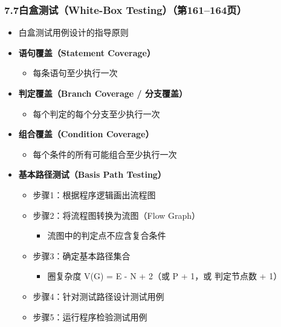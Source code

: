 \documentclass[12pt,a4paper]{ctexart}
\begin{document}
\subsubsection{7.7\quad 白盒测试（White-Box Testing）\hfill（第161--164页）}
\begin{itemize}
    \item 白盒测试用例设计的指导原则
    \item \textbf{语句覆盖（Statement Coverage）}
    \begin{itemize}
        \item 每条语句至少执行一次
    \end{itemize}
    \item \textbf{判定覆盖（Branch Coverage / 分支覆盖）}
    \begin{itemize}
        \item 每个判定的每个分支至少执行一次
    \end{itemize}
    \item \textbf{组合覆盖（Condition Coverage）}
    \begin{itemize}
        \item 每个条件的所有可能组合至少执行一次
    \end{itemize}
    \item \textbf{基本路径测试（Basis Path Testing）}
    \begin{itemize}
        \item 步骤1：根据程序逻辑画出流程图
        \item 步骤2：将流程图转换为流图（Flow Graph）
        \begin{itemize}
            \item 流图中的判定点不应含复合条件
        \end{itemize}
        \item 步骤3：确定基本路径集合
        \begin{itemize}
            \item 圈复杂度 V(G) = E - N + 2（或 P + 1，或 判定节点数 + 1）
        \end{itemize}
        \item 步骤4：针对测试路径设计测试用例
        \item 步骤5：运行程序检验测试用例
    \end{itemize}
\end{itemize}
\end{document}
